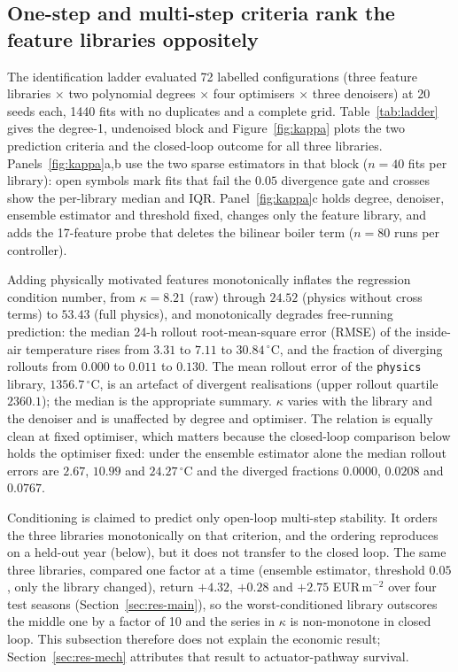 \subsection{One-step and multi-step criteria rank the feature libraries oppositely}
\label{sec:res-ladder}

The identification ladder evaluated 72 labelled configurations (three feature libraries
$\times$ two polynomial degrees $\times$ four optimisers $\times$ three denoisers) at 20
seeds each, 1440 fits with no duplicates and a complete grid. Table~\ref{tab:ladder}
gives the degree-1, undenoised block and Figure~\ref{fig:kappa} plots the two prediction
criteria and the closed-loop outcome for all three libraries.
Panels~\ref{fig:kappa}a,b use the two sparse estimators in that block ($n=40$ fits per
library): open symbols mark fits that fail the $0.05$ divergence gate and crosses show the
per-library median and IQR. Panel~\ref{fig:kappa}c holds degree, denoiser, ensemble
estimator and threshold fixed, changes only the feature library, and adds the 17-feature
probe that deletes the bilinear boiler term ($n=80$ runs per controller).

Adding physically motivated features monotonically inflates the regression condition
number, from $\kappa=8.21$ (raw) through $24.52$ (physics without cross terms) to $53.43$
(full physics), and monotonically degrades free-running prediction: the median 24-h
rollout root-mean-square error (RMSE) of the inside-air temperature rises from $3.31$ to $7.11$ to $30.84\,^\circ$C,
and the fraction of diverging rollouts from $0.000$ to $0.011$ to $0.130$. The mean
rollout error of the \texttt{physics} library, $1356.7\,^\circ$C, is an artefact of
divergent realisations (upper rollout quartile $2360.1$); the median is the appropriate
summary. $\kappa$ varies with the library and the denoiser and is unaffected by degree and
optimiser. The relation is equally clean at fixed optimiser, which matters because the
closed-loop comparison below holds the optimiser fixed: under the ensemble estimator alone
the median rollout errors are $2.67$, $10.99$ and $24.27\,^\circ$C and the diverged
fractions $0.0000$, $0.0208$ and $0.0767$.

Conditioning is claimed to predict only open-loop multi-step stability. It orders the
three libraries monotonically on that criterion, and the ordering reproduces on a held-out
year (below), but it does not transfer to the closed loop. The same three libraries,
compared one factor at a time (ensemble estimator, threshold $0.05$, only the library
changed), return $+4.32$, $+0.28$ and $+2.75$ EUR\,m$^{-2}$ over four test seasons
(Section~\ref{sec:res-main}), so the worst-conditioned library outscores the middle one by a
factor of 10 and the series in $\kappa$ is non-monotone in closed loop. This subsection
therefore does not explain the economic result; Section~\ref{sec:res-mech} attributes that
result to actuator-pathway survival.

